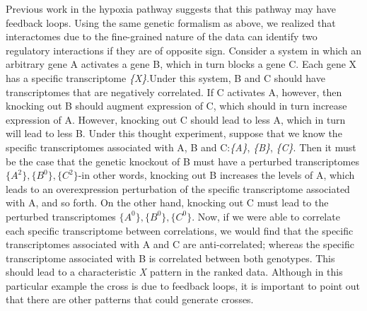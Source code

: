 \documentclass[9pt,twocolumn,twoside]{pnas-new}
\begin{document}
Previous work in the hypoxia pathway suggests that this pathway may have feedback loops. Using the same genetic formalism as above, we realized that interactomes due to the fine-grained nature of the data can identify two regulatory interactions if they are of opposite sign. Consider a system in which an arbitrary gene A activates a gene B, which in turn blocks a gene C. Each gene X has a specific transcriptome \emph{\{X\}}.Under this system, B and C should have transcriptomes that are negatively correlated. If C activates A, however, then knocking out B should augment expression of C, which should in turn increase expression of A.
However, knocking out C should lead to less A, which in turn will lead to less B. Under this thought experiment, suppose that we know the specific transcriptomes associated with A, B and C:\@\emph{\{A\}}, \emph{\{B\}}, \emph{\{C\}}. Then it must be the case that the genetic knockout of B must have a perturbed transcriptomes $\{A^2\}, \{B^0\}, \{C^2\}$-in other words, knocking out B increases the levels of A, which leads to an overexpression perturbation of the specific transcriptome associated with A, and so forth. On the other hand, knocking out C must lead to the perturbed transcriptomes $\{A^0\}, \{B^0\}, \{C^0\}$.
Now, if we were able to correlate each specific transcriptome between correlations, we would find that the specific transcriptomes associated with A and C are anti-correlated; whereas the specific transcriptome associated with B is correlated between both genotypes. This should lead to a characteristic \emph{X} pattern in the ranked data. Although in this particular example the cross is due to feedback loops, it is important to point out that there are other patterns that could generate crosses.
\end{document}
